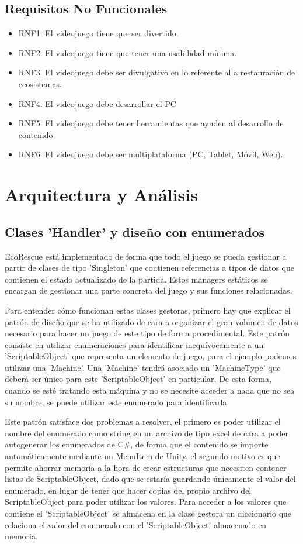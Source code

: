 \subsection{Requisitos No Funcionales}

\begin{itemize}
    \item RNF1. El videojuego tiene que ser divertido.
    \item RNF2. El videojuego tiene que tener una usabilidad mínima.
    \item RNF3. El videojuego debe ser divulgativo en lo referente al a restauración de ecosistemas.
    \item RNF4. El videojuego debe desarrollar el PC
    \item RNF5. El videojuego debe tener herramientas que ayuden al desarrollo de contenido
    \item RNF6. El videojuego debe ser multiplataforma (PC, Tablet, Móvil, Web).
\end{itemize}

\section{Arquitectura y Análisis}
\subsection{Clases 'Handler' y diseño con enumerados}
EcoRescue está implementado de forma que todo el juego se pueda gestionar a partir de clases de tipo 'Singleton' que contienen referencias a tipos de datos que contienen el estado actualizado de la partida. Estos managers estáticos se encargan de gestionar una parte concreta del juego y sus funciones relacionadas.

Para entender cómo funcionan estas clases gestoras, primero hay que explicar el patrón de diseño que se ha utilizado de cara a organizar el gran volumen de datos necesario para hacer un juego de este tipo de forma procedimental. Este patrón consiste en utilizar enumeraciones para identificar inequívocamente a un 'ScriptableObject' que representa un elemento de juego, para el ejemplo podemos utilizar una 'Machine'. Una 'Machine' tendrá asociado un 'MachineType' que deberá ser único para este 'ScriptableObject' en particular. De esta forma, cuando se esté tratando esta máquina y no se necesite acceder a nada que no sea su nombre, se puede utilizar este enumerado para identificarla. 

Este patrón satisface dos problemas a resolver, el primero es poder utilizar el nombre del enumerado como string en un archivo de tipo excel de cara a poder autogenerar los enumerados de C\#, de forma que el contenido se importe automáticamente mediante un MenuItem de Unity, el segundo motivo es que permite ahorrar memoria a la hora de crear estructuras que necesiten contener listas de ScriptableObject, dado que se estaría guardando únicamente el valor del enumerado, en lugar de tener que hacer copias del propio archivo del ScriptableObject para poder utilizar los valores. Para acceder a los valores que contiene el 'ScriptableObject' se almacena en la clase gestora un diccionario que relaciona el valor del enumerado con el 'ScriptableObject' almacenado en memoria. 

